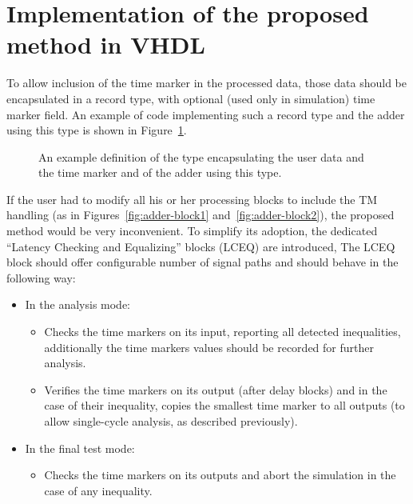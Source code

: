 \documentclass[preprint,11pt]{elsarticle}
\begin{document}
\section{Implementation of the proposed method in VHDL}
To allow inclusion of the time marker in the processed data, those data should be encapsulated in a record type, with optional (used only in simulation) time marker field. An example of code implementing such a record type and the adder using this type is shown in Figure~\ref{fig:adder-impl-example}.
	\begin{figure}
	\begin{minipage}{\linewidth}
	{
\scriptsize
\begin{multicols}{2}

	\end{multicols}
	}
	\end{minipage}
	\vspace{3mm}
	\caption{\label{fig:adder-impl-example}
	An example definition of the type encapsulating the user data and the time marker and of the adder using this type.}
	\end{figure}
If the user had to modify all his or her processing blocks to include the TM handling (as in Figures~\ref{fig:adder-block1} and~\ref{fig:adder-block2}), the proposed method would be very inconvenient.
To simplify its adoption, the dedicated ``Latency Checking and Equalizing'' blocks (LCEQ) are introduced, 
The LCEQ block should offer configurable number of signal paths and should behave in the following way:
\begin{itemize}
\item In the analysis mode:
\begin{itemize}
\item Checks the time markers on its input, reporting all detected inequalities, additionally the time markers values should be recorded for further analysis.
\item Verifies the time markers on its output (after delay blocks) and in the case of their 
inequality, copies the smallest time marker to all outputs (to allow single-cycle analysis, as described previously).
\end{itemize}
\item In the final test mode: 
\begin{itemize}
\item Checks the time markers on its outputs and abort the simulation in the case of any inequality.
\end{itemize}
\end{itemize}
\end{document}
